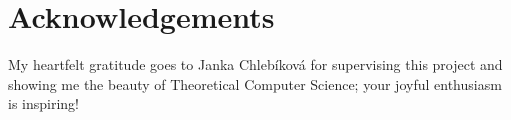 \section*{Acknowledgements}

My heartfelt gratitude goes to Janka Chlebíková for supervising this project and showing me the beauty of Theoretical Computer Science; your joyful enthusiasm is inspiring!
